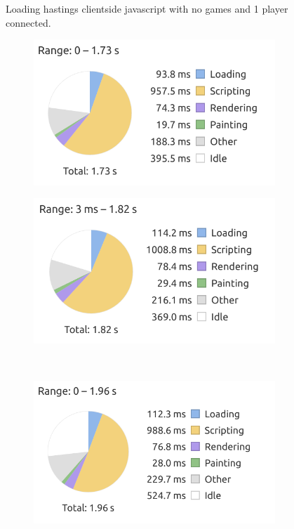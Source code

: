 \begin{figure}[H]
    \caption{Loading hastings clientside javascript with no games and 1 player connected.}
    \label{fig:my_label}
\end{figure}

\begin{figure}[h!]
    \centering
    \begin{subfigure}{0.49\textwidth}
        \includegraphics[width=\textwidth]{figure/clientsidePerformance/graph30games1.png}
    \end{subfigure}
    \begin{subfigure}{0.49\textwidth}
        \includegraphics[width=\textwidth]{figure/clientsidePerformance/graph30games2.png}
    \end{subfigure}
    \\
    \begin{subfigure}{0.5\textwidth}
        \includegraphics[width=\textwidth]{figure/clientsidePerformance/graph30games3.png}
    \end{subfigure}
    

\end{figure}
